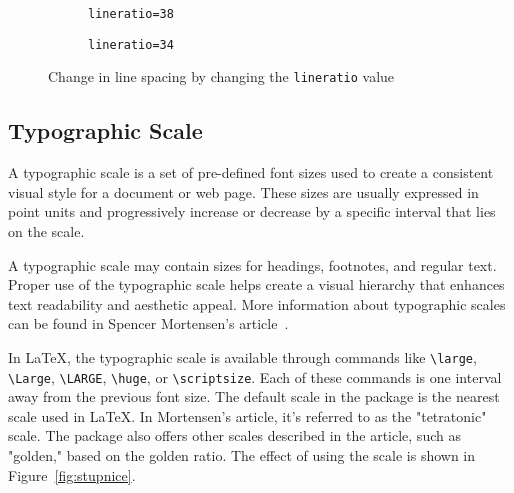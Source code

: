 \documentclass{ltugboat}
\begin{document}
\begin{figure}[tbp]
  \begin{subfigure}[b]{0.45\textwidth}
\caption{\texttt{lineratio=38}}
\end{subfigure}
\begin{subfigure}[b]{0.45\textwidth}
\caption{\texttt{lineratio=34}}
\end{subfigure}
  \caption{Change in line spacing by changing the \texttt{lineratio} value}\label{fig:lineratio}
\end{figure}

\subsection{Typographic Scale}

A typographic scale is a set of pre-defined font sizes used to create a
consistent visual style for a document or web page. These sizes are usually
expressed in point units and progressively increase or decrease by a specific
interval that lies on the scale.

A typographic scale may contain sizes for headings, footnotes, and regular
text. Proper use of the typographic scale helps create a visual hierarchy that
enhances text readability and aesthetic appeal. More information about
typographic scales can be found in Spencer Mortensen's
article~\cite{mortensen}.

In \LaTeX, the typographic scale is available through commands like
\verb|\large|, \verb|\Large|, \verb|\LARGE|, \verb|\huge|, or
\verb|\scriptsize|. Each of these commands is one interval away from the
previous font size. The default scale in the  package is the
nearest scale used in \LaTeX. In Mortensen's article, it's referred to as the
"tetratonic" scale. The package also offers other scales described in the
article, such as "golden," based on the golden ratio. The effect of using the
scale is shown in Figure~\ref{fig:stupnice}.
\end{document}
